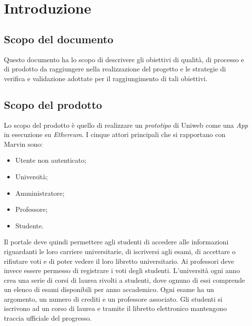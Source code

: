 \section{Introduzione}
\subsection{Scopo del documento}
Questo documento ha lo scopo di descrivere gli obiettivi di qualità, di processo e di prodotto da raggiungere nella realizzazione del progetto e le strategie di verifica e validazione adottate per il raggiungimento di tali obiettivi.
\subsection{Scopo del prodotto}
\begin{comment}
L'obiettivo di Marvin è di realizzare un \textit{prototipo}\ped{G} di Uniweb come \textit{ÐApp}\ped{G} che giri su \textit{Ethereum}\ped{G}. Gli attori principali che si rapportano con Marvin sono:
\begin{enumerate}
	\item Università;
	\item Professori;
	\item Studenti.
\end{enumerate}
Il portale deve quindi permettere agli studenti di accedere alle informazioni riguardanti le loro carriere universitarie, di iscriversi agli esami, di accettare o rifiutare voti e di poter vedere il loro libretto universitario.
Ai professori deve invece essere permesso registrare i voti degli studenti.
L'università ogni anno crea una serie di corsi di laurea rivolti a studenti, dove ognuno di essi comprende un elenco di esami disponibili per anno accademico. Ogni esame ha un argomento, un numero di crediti e un professore associato. Gli studenti si iscrivono ad un corso di laurea e tramite il libretto elettronico mantengono traccia ufficiale del progresso.
\end{comment}
Lo scopo del prodotto è quello di realizzare un \emph{prototipo} di Uniweb come una \emph{\DJ App} in esecuzione su \emph{Ethereum}. I cinque attori principali che si rapportano con Marvin sono:
\begin{itemize}
	\item Utente non autenticato; 
	\item Università;
	\item Amministratore;
	\item Professore;
	\item Studente.
\end{itemize} 
Il portale deve quindi permettere agli studenti di accedere alle informazioni riguardanti le loro carriere universitarie, di iscriversi agli esami, di accettare o rifiutare voti e di poter vedere il loro libretto universitario.
Ai professori deve invece essere permesso di registrare i voti degli studenti.
L'università ogni anno crea una serie di corsi di laurea rivolti a studenti, dove ognuno di essi comprende un elenco di esami disponibili per anno accademico. Ogni esame ha un argomento, un numero di crediti e un professore associato. Gli studenti si iscrivono ad un corso di laurea e tramite il libretto elettronico mantengono traccia ufficiale del progresso.
